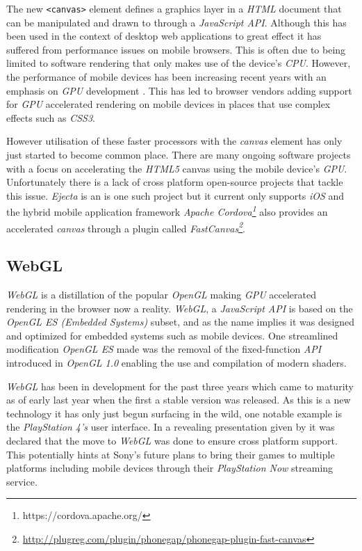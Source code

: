 \documentclass[final]{cmpreport}
\begin{document}
The new \texttt{<canvas>} element defines a graphics layer in a \textit{HTML} document that can be manipulated and drawn to through a \textit{JavaScript API}. Although this has been used in the context of desktop web applications to great effect it has suffered from performance issues on mobile browsers. This is often due to being limited to software rendering that only makes use of the device's \textit{CPU}. However, the performance of mobile devices has been increasing recent years with an emphasis on \textit{GPU} development \cite{Lin}. This has led to browser vendors adding support for \textit{GPU} accelerated rendering on mobile devices in places that use complex effects such as \textit{CSS3}.

However utilisation of these faster processors with the \textit{canvas} element has only just started to become common place. There are many ongoing software projects with a focus on accelerating the \textit{HTML5} canvas using the mobile device's \textit{GPU}. Unfortunately there is a lack of cross platform open-source projects that tackle this issue. \textit{Ejecta} is an is one such project but it current only supports \textit{iOS} and the hybrid mobile application framework \textit{Apache Cordova\footnote{https://cordova.apache.org/}} also provides an accelerated \textit{canvas} through a plugin called \textit{FastCanvas\footnote{\url{http://plugreg.com/plugin/phonegap/phonegap-plugin-fast-canvas}}}.

\subsection{WebGL}
\textit{WebGL} is a distillation of the popular \textit{OpenGL} making \textit{GPU} accelerated rendering in the browser now a reality. \textit{WebGL}, a \textit{JavaScript API} is based on the \textit{OpenGL ES (Embedded Systems)} subset, and as the name implies it was designed and optimized for embedded systems such as mobile devices. One streamlined modification \textit{OpenGL ES} made was the removal of the fixed-function \textit{API} introduced in \textit{OpenGL 1.0} enabling the use and compilation of modern shaders.

\textit{WebGL} has been in development for the past three years which came to maturity as of early last year when the first a stable version was released. As this is a new technology it has only just begun surfacing in the wild, one notable example is the \textit{PlayStation 4's} user interface. In a revealing presentation given by \cite{Olmstead} it was declared that the move to \textit{WebGL} was done to ensure cross platform support. This potentially hints at Sony's future plans to bring their games to multiple platforms including mobile devices through their \textit{PlayStation Now} streaming service.
\end{document}
